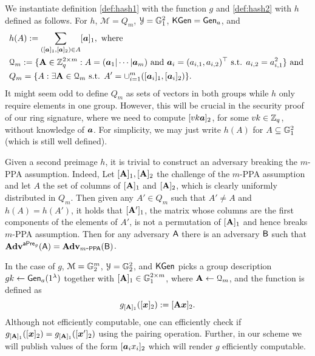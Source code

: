 
We instantiate definition \ref{def:hash1} with the function $g$ and \ref{def:hash2}  with $h$ defined as follows. For  $h$, $\mathcal{M}=Q_m$, $\mathcal{Y}=\mathbb{G}_1^2$, $\mathsf{KGen}=\mathsf{Gen}_a$, and
\begin{align*}
&h(A):= \sum_{([{\boldsymbol{a}}]_1,[{\boldsymbol{a}}]_2)\in A}[{\boldsymbol{a}}]_1, \text{ where}\\
&\mathcal{Q}_m := \{\mathbf{{A}}\in \mathbb{Z}_q^{2\times m}:A=({\boldsymbol{a}}_1|\cdots|{\boldsymbol{a}}_m) \text{ and } {\boldsymbol{a}}_i = (a_{i,1},a_{i,2})^\top \text{ s.t. } a_{i,2} = a_{i,1}^2\}\text{ and }\\
&Q_m = \{A : \exists \mathbf{{A}}\in\mathcal{Q}_m\text{ s.t. } A' = \cup_{i=1}^m([{\boldsymbol{a}}_i]_1,[{\boldsymbol{a}}_i]_2)\}.
\end{align*}
It might seem odd to define $Q_m$ as sets  of vectors in both groups while $h$ only require elements in one group. However, this will be crucial in the security proof of our ring signature, where we need to compute $[vk {\boldsymbol{a}}]_2$, for some $vk\in\mathbb{Z}_q$, without knowledge of ${\boldsymbol{a}}$. For simplicity, we may just write $h(A)$ for $A\subseteq \mathbb{G}_1^2$ (which is still well defined).

Given a second preimage $h$, it is trivial to construct an adversary breaking the $m$-PPA assumption. Indeed, Let $[\mathbf{{A}}]_1,[\mathbf{{A}}]_2$ the challenge of the $m$-PPA assumption and let $A$ the set of columns of $[\mathbf{{A}}]_1$ and $[\mathbf{{A}}]_2$, which is clearly uniformly distributed in $Q_m$. Then given any $A'\in Q_m$ such that $A'\neq A$ and $h(A)=h(A')$, it holds that $[\mathbf{{A}}']_1$, the matrix whose columns are the first components of the elements of $A'$, is not a permutation of $[\mathbf{{A}}]_1$ and hence breaks $m$-PPA assumption. Then for any adversary $\mathsf{A}$ there is an adversary $\mathsf{B}$ such that $\mathbf{Adv}^{\mathsf{aPre}_g}(\mathsf{A})=\mathbf{Adv}_{m\mbox{-}\mathsf{PPA}}(\mathsf{B})$. 

In the case of $g$, $\mathcal{M}=\mathbb{G}^m_2$, $\mathcal{Y}=\mathbb{G}_2^2$, and $\mathsf{KGen}$ picks a group description $gk\gets\mathsf{Gen}_a(1^\lambda)$ together with $[\mathbf{{A}}]_1\in\mathbb{G}^{2\times m}_1$, where $\mathbf{{A}}\gets\mathcal{Q}_m$, and the function is defined as
$$
g_{[\mathbf{{A}}]_1}([{\boldsymbol{x}}]_2):= [\mathbf{{A}}{\boldsymbol{x}}]_2.
$$
Although not efficiently computable, one can efficiently check if $g_{[\mathbf{{A}}]_1}([{\boldsymbol{x}}]_2) = g_{[\mathbf{{A}}]_1}([{\boldsymbol{x}}']_2)$ using the pairing operation. Further, in our scheme we will publish values of the form $[{\boldsymbol{a}}_ix_i]_2$ which will render $g$ efficiently computable.

